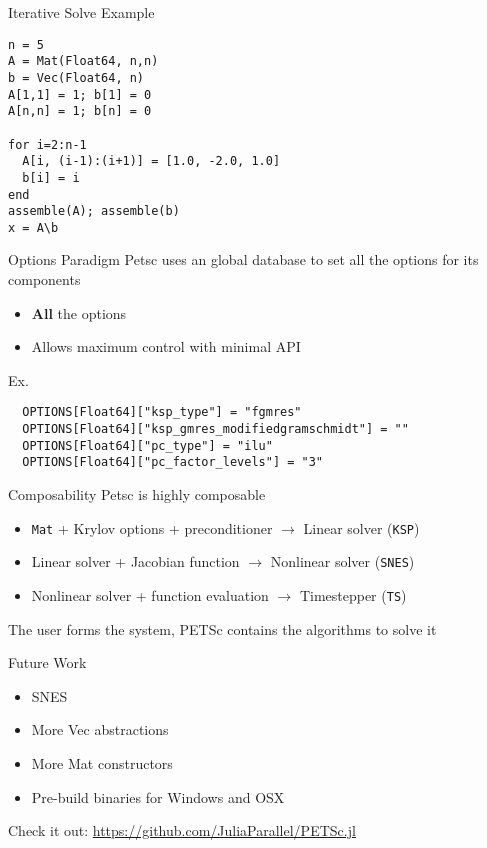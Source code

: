 \documentclass{beamer}
\begin{document}
\begin{frame}[fragile]{Iterative Solve Example}
\begin{verbatim}
n = 5
A = Mat(Float64, n,n)
b = Vec(Float64, n)
A[1,1] = 1; b[1] = 0
A[n,n] = 1; b[n] = 0

for i=2:n-1
  A[i, (i-1):(i+1)] = [1.0, -2.0, 1.0]
  b[i] = i
end
assemble(A); assemble(b)
x = A\b
\end{verbatim}
\end{frame}

\begin{frame}[fragile]{Options Paradigm}
Petsc uses an global database to set all the options for its components
\begin{itemize}
  \item \textbf{All} the options
  \item Allows maximum control with minimal API
\end{itemize}
\hfill

Ex.
\begin{verbatim}
  OPTIONS[Float64]["ksp_type"] = "fgmres"
  OPTIONS[Float64]["ksp_gmres_modifiedgramschmidt"] = ""
  OPTIONS[Float64]["pc_type"] = "ilu"
  OPTIONS[Float64]["pc_factor_levels"] = "3"
\end{verbatim}

\end{frame}

\begin{frame}{Composability}
Petsc is highly composable
\begin{itemize}
  \item \texttt{Mat} + Krylov options + preconditioner $\rightarrow$ Linear solver (\texttt{KSP})
  \item Linear solver + Jacobian function $\rightarrow$ Nonlinear solver (\texttt{SNES})
  \item Nonlinear solver + function evaluation $\rightarrow$ Timestepper (\texttt{TS})
\end{itemize}
\hfill

The user forms the system, PETSc contains the algorithms to solve it
\end{frame}



\begin{frame}{Future Work}
  \begin{itemize}
    \item SNES
    \item More Vec abstractions
    \item More Mat constructors
    \item Pre-build binaries for Windows and OSX
  \end{itemize}
\end{frame}

\begin{frame}
\begin{center}  
  Check it out: \hyperref[https://github.com/JuliaParallel/PETSc.jl]{https://github.com/JuliaParallel/PETSc.jl}
\end{center}

\end{frame}
\end{document}
